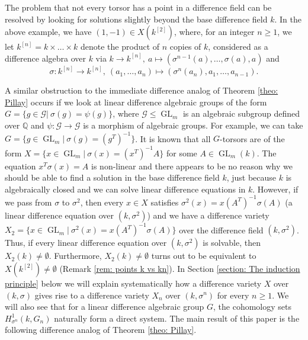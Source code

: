 \documentclass[oneside,reqno]{amsart}
\theoremstyle{definition}
\newcommand{\G}{\mathcal{G}}
\newcommand{\Gl}{\operatorname{GL}}
\newcommand{\s}{\sigma}
\newcommand{\kn}{k^{[n]}}
\begin{document}
The problem that not every torsor has a point in a difference field can be resolved by looking for solutions slightly beyond the base difference field $k$. In the above example, we have $(1,-1)\in X(k^{[2]})$, where, for an integer $n\geq 1$, we let $\kn=k\times\ldots\times k$ denote the product of $n$ copies of $k$, considered as a difference algebra over $k$ via \label{page: kn}
$k\to\kn,\ a\mapsto (\s^{n-1}(a),\ldots,\s(a),a)$ and
$$\s\colon\kn\to\kn,\ (a_1,\ldots,a_n)\mapsto (\s^n(a_n),a_1,\ldots,a_{n-1}).$$ 


A similar obstruction to the immediate difference analog of Theorem \ref{theo: Pillay} occurs if we look at linear difference algebraic groups of the form $G=\{g\in \G|\ \s(g)=\psi(g) \}$, where $\G\leq\Gl_m$ is an algebraic subgroup defined over $\mathbb{Q}$ and $\psi\colon \G\to \G$ is a morphism of algebraic groups. For example, we can take $G=\{g\in\Gl_m|\ \s(g)=(g^T)^{-1}\}$. %
It is known that all $G$-torsors are of the form $X=\{x\in\Gl_m|\ \s(x)= (x^T)^{-1}A\}$ \label{page: X} for some $A\in\Gl_m(k)$. The equation $x^T\s(x)=A$ is non-linear and there appears to be no reason why we should be able to find a solution in the base difference field $k$, just because $k$ is algebraically closed and we can solve linear difference equations in $k$. However, if we pass from $\s$ to $\s^2$, then every $x\in X$ satisfies $\s^2(x)=x(A^T)^{-1}\s(A)$ (a linear difference equation over $(k,\s^2)$) and we have a difference variety
$X_2=\{x\in\Gl_m|\ \s^2(x)=x(A^T)^{-1}\s(A)\}$
over the difference field $(k,\s^2)$. Thus, if every linear difference equation over $(k,\s^2)$ is solvable, then $X_2(k)\neq\emptyset$. Furthermore, $X_2(k)\neq\emptyset$ turns out to be equivalent to $X(k^{[2]})\neq\emptyset$ (Remark \ref{rem: points k vs kn}).
In Section \ref{section: The induction principle} below we will explain systematically how a difference variety $X$  over $(k,\sigma)$ gives rise to a difference variety $X_n$ over $(k,\s^n)$ for every $n\geq 1$. We will also see that for a linear difference algebraic group $G$, the cohomology sets $H^1_{\s^n}(k,G_n)$ %
naturally form a direct system. The main result of this paper is the following difference analog of Theorem \ref{theo: Pillay}.
\end{document}
